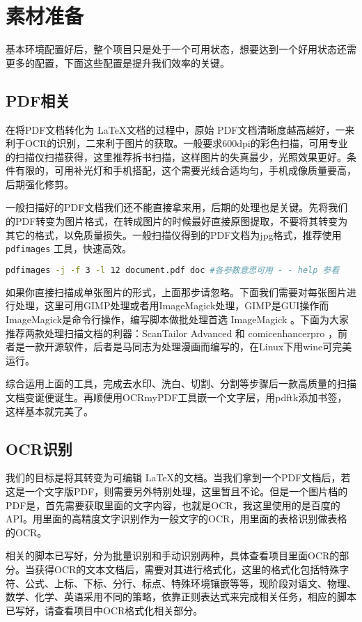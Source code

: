 \section{素材准备}

基本环境配置好后，整个项目只是处于一个可用状态，想要达到一个好用状态还需更多的配置，下面这些配置是提升我们效率的关键。

\subsection{PDF相关}

在将PDF文档转化为 \LaTeX 文档的过程中，原始 PDF文档清晰度越高越好，一来利于OCR的识别，二来利于图片的获取。一般要求600dpi的彩色扫描，可用专业的扫描仪扫描获得，这里推荐拆书扫描，这样图片的失真最少，光照效果更好。条件有限的，可用补光灯和手机搭配，这个需要光线合适均匀，手机成像质量要高，后期强化修剪。

一般扫描好的PDF文档我们还不能直接拿来用，后期的处理也是关键。先将我们的PDF转变为图片格式，在转成图片的时候最好直接原图提取，不要将其转变为其它的格式，以免质量损失。一般扫描仪得到的PDF文档为jpg格式，推荐使用  \lstinline|pdfimages| 工具，快速高效。
\begin{lstlisting}[language=bash]
pdfimages -j -f 3 -l 12 document.pdf doc #各参数意思可用 - - help 参看
\end{lstlisting}


如果你直接扫描成单张图片的形式，上面那步请忽略。下面我们需要对每张图片进行处理，这里可用GIMP处理或者用ImageMagick处理，GIMP是GUI操作而ImageMagick是命令行操作，编写脚本做批处理首选 ImageMagick 。下面为大家推荐两款处理扫描文档的利器：ScanTailor Advanced 和  comicenhancerpro ，前者是一款开源软件，后者是马同志为处理漫画而编写的，在Linux下用wine可完美运行。

综合运用上面的工具，完成去水印、洗白、切割、分割等步骤后一款高质量的扫描文档变诞便诞生。再顺便用OCRmyPDF工具嵌一个文字层，用pdftk添加书签，这样基本就完美了。


\subsection{OCR识别}

我们的目标是将其转变为可编辑 \LaTeX 的文档。当我们拿到一个PDF文档后，若这是一个文字版PDF，则需要另外特别处理，这里暂且不论。但是一个图片档的PDF是，首先需要获取里面的文字内容，也就是OCR，我这里使用的是百度的API。用里面的高精度文字识别作为一般文字的OCR，用里面的表格识别做表格的OCR。

相关的脚本已写好，分为批量识别和手动识别两种，具体查看项目里面OCR的部分。当获得OCR的文本文档后，需要对其进行格式化，这里的格式化包括特殊字符、公式、上标、下标、分行、标点、特殊环境镶嵌等等，现阶段对语文、物理、数学、化学、英语采用不同的策略，依靠正则表达式来完成相关任务，相应的脚本已写好，请查看项目中OCR格式化相关部分。


